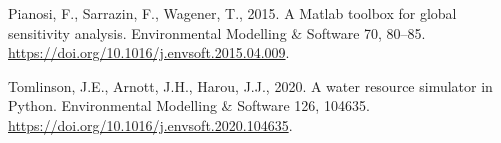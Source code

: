 \documentclass[3p,11pt]{elsarticle}
\begin{document}
\begin{thebibliography}{}
Pianosi, F., Sarrazin, F., Wagener, T., 2015. A Matlab toolbox for global
sensitivity analysis. Environmental Modelling \& Software 70, 80--85.
\url{https://doi.org/10.1016/j.envsoft.2015.04.009}.

Tomlinson, J.E., Arnott, J.H., Harou, J.J., 2020. A water resource
simulator in Python. Environmental Modelling \& Software 126, 104635.
\url{https://doi.org/10.1016/j.envsoft.2020.104635}.

\end{thebibliography}
\end{document}
